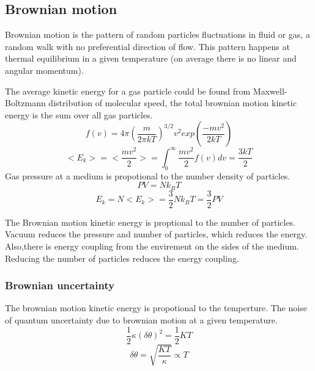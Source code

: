 \documentclass[\main/master.tex]{subfiles}
\begin{document}
\subsection{Brownian motion}
Brownian motion is the pattern of random particles fluctuations in fluid or gas, a random walk with no preferential direction of flow. This pattern happens at thermal equilibrium in a given temperature (on average there is no linear and angular momentum). 
\par
The average kinetic energy for a gas particle could be found from Maxwell-Boltzmann distribution of molecular speed, the total brownian motion kinetic energy is the sum over all gas particles.
\begin{equation}
f(v) = 4\pi(\frac{m}{2\pi kT})^{3/2}v^2exp(\frac{-mv^2}{2kT})     \label{eqn:Maxwell_Boltzmann}
\end{equation}  
\begin{equation}
<E_k>=<\frac{mv^2}{2}> = \int_{0}^{\infty}\frac{mv^2}{2}f(v)dv =  \frac{3kT}{2}    \label{eqn:avrage_kinetic}
\end{equation}
Gas pressure at a medium is propotional to the number density of particles.    
\begin{equation}
PV = Nk_BT  \label{eqn:ideal-gasses}
\end{equation}
\begin{equation}
E_k=N<E_k> =\frac{3}{2}Nk_BT = \frac{3}{2}PV    \label{eqn:total_kinetic}
\end{equation}

The Brownian motion kinetic energy is proptional to the number of particles. Vacuum reduces the pressure and number of particles, which reduces the energy. Also,there is energy coupling from the envirement on the sides of the medium. Reducing the number of particles reduces the energy coupling.
\subsubsection{Brownian uncertainty}
The brownian motion kinetic energy is propotional to the temperture. The noise of quantum uncertainty due to brownian motion at a given temperature. 
\begin{equation}
\frac{1}{2}\kappa (\delta\theta)^2= \frac{1}{2}KT  \label{eqn:radiation force}
\end{equation}
\begin{equation}
\delta\theta = \sqrt{\frac{KT}{\kappa}}\propto{T}  \label{eqn:radiation force}
\end{equation}
\end{document}
